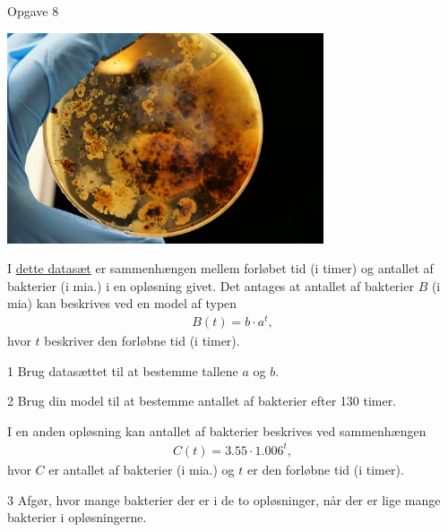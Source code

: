 \documentclass[12pt,x11names,a4paper]{article}
\begin{document}

\begin{opgavetekst}{Opgave 8}
	\begin{center}
		\includegraphics[width=0.7\textwidth]{Billeder/Bakterie.jpg}
	\end{center}
	I \href{https://github.com/ChristianJLex/TeachingNotes/raw/master/2022-2023/Data%20og%20lign/BakterierAfl5.xlsx}{\color{blue!60} dette datasæt} er sammenhængen mellem forløbet tid (i timer) og antallet af 	
	   bakterier (i mia.) i en opløsning givet. Det antages at antallet af bakterier $B$ (i mia) kan beskrives ved en 
	model af typen
	\begin{align*}
		B(t) = b\cdot a^t,
	\end{align*}
	hvor $t$ beskriver den forløbne tid (i timer).
\end{opgavetekst}

\begin{delopgave}{}{1}
	Brug datasættet til at bestemme tallene $a$ og $b$.
\end{delopgave}

\begin{delopgave}{}{2}
	Brug din model til at bestemme antallet af bakterier efter 130 timer. 
\end{delopgave}

\begin{meretekst}
	I en anden opløsning kan antallet af bakterier beskrives ved sammenhængen 
	\begin{align*}
		C(t) = 3.55 \cdot 1.006^t,
	\end{align*}
	hvor $C$ er antallet af bakterier (i mia.) og $t$ er den forløbne tid (i timer).
\end{meretekst}

\begin{delopgave}{}{3}
	Afgør, hvor mange bakterier der er i de to opløsninger, når der er lige mange bakterier i opløsningerne. 
\end{delopgave}
\end{document}
